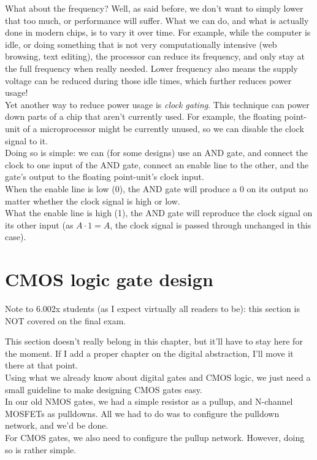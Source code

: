 \documentclass[12pt,a4paper]{report}
\begin{document}
What about the frequency? Well, as said before, we don't want to simply lower that too much, or performance will suffer. What we can do, and what is actually done in modern chips, is to vary it over time. For example, while the computer is idle, or doing something that is not very computationally intensive (web browsing, text editing), the processor can reduce its frequency, and only stay at the full frequency when really needed. Lower frequency also means the supply voltage can be reduced during those idle times, which further reduces power usage!\\

Yet another way to reduce power usage is \emph{clock gating}. This technique can power down parts of a chip that aren't currently used. For example, the floating point-unit of a microprocessor might be currently unused, so we can disable the clock signal to it.\\
Doing so is simple: we can (for some designs) use an AND gate, and connect the clock to one input of the AND gate, connect an enable line to the other, and the gate's output to the floating point-unit's clock input.\\
When the enable line is low (0), the AND gate will produce a 0 on its output no matter whether the clock signal is high or low.\\
What the enable line is high (1), the AND gate will reproduce the clock signal on its other input (as $A \cdot 1 = A$, the clock signal is passed through unchanged in this case).

\section{CMOS logic gate design}
\large{Note to 6.002x students (as I expect virtually all readers to be): this section is NOT covered on the final exam.}\\
\normalsize

This section doesn't really belong in this chapter, but it'll have to stay here for the moment. If I add a proper chapter on the digital abstraction, I'll move it there at that point.\\
Using what we already know about digital gates and CMOS logic, we just need a small guideline to make designing CMOS gates easy.\\
In our old NMOS gates, we had a simple resistor as a pullup, and N-channel MOSFETs as pulldowns. All we had to do was to configure the pulldown network, and we'd be done.\\
For CMOS gates, we also need to configure the pullup network. However, doing so is rather simple.\\
\end{document}

